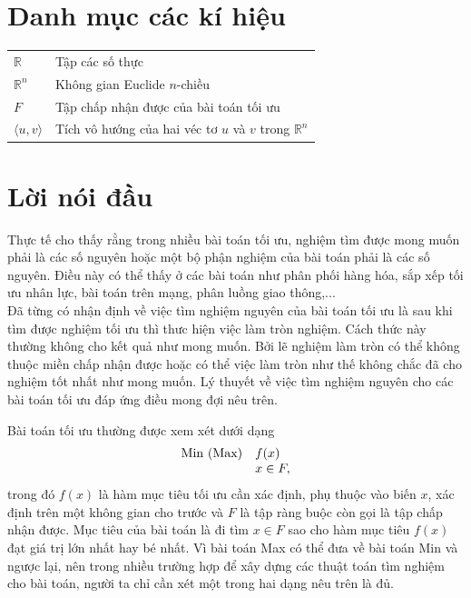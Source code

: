 \documentclass[12pt,a4paper]{report}
\begin{document}
	\vspace{1cm}
	\newpage
	
	\tableofcontents
	\chapter*{Danh mục các kí hiệu}
	\thispagestyle{fancy}
	\begin{longtable}{l l}
		
		$\mathbb{R}$ & Tập các số thực\\
		$\mathbb{R}^n$ & Không gian Euclide $n$-chiều\\

		
		$F$ & Tập chấp nhận được của bài toán tối ưu\\
		$\langle u, v \rangle$ & Tích vô hướng của hai véc tơ $u$ và $v$ trong $\mathbb{R}^n$\\
		
		
	\end{longtable}
\newpage
{} 
\chapter*{Lời nói đầu}
\thispagestyle{fancy}
\renewcommand{\baselinestretch}{1.2}
Thực tế cho thấy rằng trong nhiều bài toán tối ưu, nghiệm tìm được mong muốn phải là các số nguyên hoặc một bộ phận nghiệm của bài toán phải là các số nguyên. Điều này có thể thấy ở các bài toán như phân phối hàng hóa, sắp xếp tối ưu nhân lực, bài toán trên mạng, phân luồng giao thông,...\\
Đã từng có nhận định về việc tìm nghiệm nguyên của bài toán tối ưu là sau khi tìm được nghiệm tối ưu thì thưc hiện việc làm tròn nghiệm. Cách thức này thường không cho kết quả như mong muốn. Bởi lẽ nghiệm làm tròn có thể không thuộc miền chấp nhận được hoặc  có thể việc làm tròn như thế không chắc đã cho nghiệm tốt nhất như mong muốn. Lý thuyết về việc tìm nghiệm nguyên cho các bài toán tối ưu đáp ứng điều mong đợi nêu trên.

Bài toán tối ưu thường được xem xét dưới dạng 
$$
\begin{array}{ll}
{\rm Min\ (Max)}& f(x)\\
&x \in F,
\end{array}
$$
trong đó $f(x)$ là hàm mục tiêu tối ưu cần xác định, phụ thuộc vào biến $x$, xác định trên một không gian cho trước và $F$ là tập ràng buộc còn gọi là tập chấp nhận được. Mục tiêu của bài toán là đi tìm $x\in F$ sao cho hàm mục tiêu $f(x)$ đạt giá trị lớn nhất hay bé nhất.
Vì bài toán Max có thể đưa về bài toán Min và ngược lại, nên trong nhiều trường hợp để xây dựng các thuật toán tìm nghiệm cho bài toán, người ta chỉ cần xét một trong hai dạng nêu trên là đủ.
\end{document}

